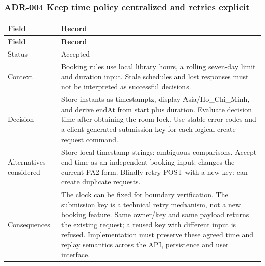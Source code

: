 \vspace{2mm}

\subsubsection{ADR-004 Keep time policy centralized and retries explicit}

\begin{longtable}{|p{}|p{}|}

\hline

\textbf{Field} & \textbf{Record} \\ \hline

\endfirsthead

\hline

\textbf{Field} & \textbf{Record} \\ \hline

\endhead

Status & Accepted \\ \hline

Context & Booking rules use local library hours, a rolling seven-\allowbreak{}day limit and duration input.\allowbreak{} Stale schedules and lost responses must not be interpreted as successful decisions.\allowbreak{} \\ \hline

Decision & Store instants as timestamptz, display Asia/\allowbreak{}Ho\_\allowbreak{}Chi\_\allowbreak{}Minh, and derive end\allowbreak{}At from start plus duration.\allowbreak{} Evaluate decision time after obtaining the room lock.\allowbreak{} Use stable error codes and a client-\allowbreak{}generated submission key for each logical create-\allowbreak{}request command.\allowbreak{} \\ \hline

Alternatives considered & Store local timestamp strings: ambiguous comparisons.\allowbreak{} Accept end time as an independent booking input: changes the current PA2 form.\allowbreak{} Blindly retry POST with a new key: can create duplicate requests.\allowbreak{} \\ \hline

Consequences & The clock can be fixed for boundary verification.\allowbreak{} The submission key is a technical retry mechanism, not a new booking feature.\allowbreak{} Same owner/\allowbreak{}key and same payload returns the existing request; a reused key with different input is refused.\allowbreak{} Implementation must preserve these agreed time and replay semantics across the API, persistence and user interface.\allowbreak{} \\ \hline

\end{longtable}

